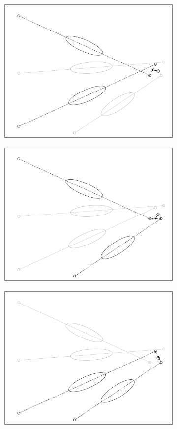 \begin{figure}
\begin{subfigure}{0.3\textwidth}
    \end{subfigure}
    \begin{subfigure}{0.3\textwidth}
        \includegraphics[width=0.9\linewidth]{Plots/stereo_magic_4.pdf} 
    \end{subfigure}
    \begin{subfigure}{0.3\textwidth}
        \includegraphics[width=0.9\linewidth]{Plots/stereo_magic_5.pdf}
    \end{subfigure}
    \begin{subfigure}{0.3\textwidth}
        \includegraphics[width=0.9\linewidth]{Plots/stereo_magic_6.pdf} 

\end{subfigure}
\end{figure}
